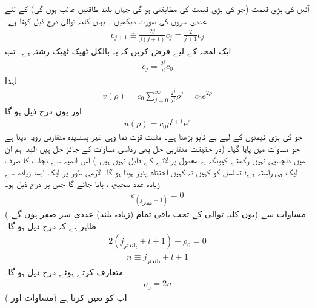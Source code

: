  آئیں  کی بڑی قیمت (جو   کی بڑی قیمت کی مطابقتی ہو گی  جہاں بلند طاقتیں غالب ہوں گی) کے لئے عددی سروں کی صورت دیکھیں ۔ یہاں  کلیہ توالی درج ذیل کہتا ہے۔
\begin{align*}
c_{j+1}\cong\frac{2j}{j(j+1)}c_{j}=\frac{2}{j+1}c_{j} 
\end{align*}
ایک لمحہ کے لیے فرض کریں  کہ یہ بالکل ٹھیک ٹھیک رشتہ ہے۔ تب 
\begin{align}
c_{j}=\frac{2^{j}}{j!}c_{0} 
\end{align}
لہٰذا
\begin{align*}
v(\rho)=c_{0}\sum_{j=0}^{\infty}\frac{2^{j}}{j!}\rho^{j}=c_{0}e^{2\rho} 
\end{align*}
 اور یوں  درج ذیل ہو گا
\begin{align}
u(\rho)=c_{0}\rho^{l+1}e^{\rho} 
\end{align}
 جو     کی بڑی قیمتوں کے لیے  بے قابو بڑھتا ہے۔ مثبت قوت نما وہی غیر پسندیدہ متقاربی رویہ دیتا ہے جو مساوات  میں پایا گیا۔ (در حقیقت  متقاربی حل بھی رداسی مساوات کے جائز حل ہیں البتہ ہم ان میں دلچسپی نہیں رکھتے  کیونکہ یہ معمول پر  لانے کے قابل نہیں ہیں۔) اس المیہ سے نجات کا صرف ایک ہی راستہ ہے؛ تسلسل کو کہیں نہ کہیں اختتام پذیر ہونا ہو گا۔ لازمی طور پر ایک ایسا زیادہ سے زیادہ عدد صحیح، ، پایا جائے گا جس پر درج ذیل ہو۔
 \begin{align}
c_{(j_{\text{بلندتر}}+1)}=0
\end{align}
 (یوں کلیہ توالی کے تحت باقی تمام (زیادہ بلند) عددی سر صفر ہوں گے۔)  مساوات  سے ظاہر ہے کہ درج ذیل ہو گا۔
 \begin{align*}
2(j_{\text{بلندتر}}+l+1)-\rho_{0}=0 
\end{align*}
 \begin{align}\label{مساوات_ابعادی_صدر_کوانٹائی_عدد}
n\equiv j_{\text{بلندتر}}+l+1 
\end{align}
 متعارف کرتے ہوئے درج ذیل ہو گا۔
 \begin{align}\label{مساوات_ابعادی_رو_این}
\rho_{0}=2n 
\end{align}
 اب  کو    تعین کرتا ہے (مساوات  اور )
